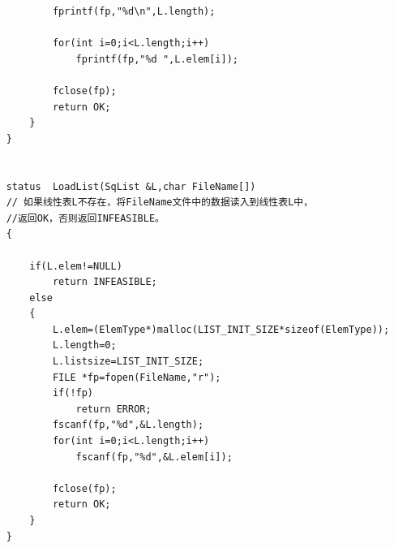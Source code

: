 \documentclass[supercite]{Experimental_Report}
\theoremstyle{definition}
\begin{document}
\begin{lstlisting}
            fprintf(fp,"%d\n",L.length);

            for(int i=0;i<L.length;i++)
                fprintf(fp,"%d ",L.elem[i]);
            
            fclose(fp);
            return OK;
        }
    }


    status  LoadList(SqList &L,char FileName[])
    // 如果线性表L不存在，将FileName文件中的数据读入到线性表L中，
    //返回OK，否则返回INFEASIBLE。
    {

        if(L.elem!=NULL)
            return INFEASIBLE;
        else
        {
            L.elem=(ElemType*)malloc(LIST_INIT_SIZE*sizeof(ElemType));
            L.length=0;
            L.listsize=LIST_INIT_SIZE;
            FILE *fp=fopen(FileName,"r");
            if(!fp)
                return ERROR;
            fscanf(fp,"%d",&L.length);
            for(int i=0;i<L.length;i++)
                fscanf(fp,"%d",&L.elem[i]);
            
            fclose(fp);
            return OK;
        }
    }
\end{lstlisting}
\newpage
\end{document}
